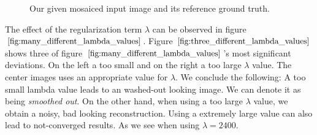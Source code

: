 \documentclass{paper}
\begin{document}
\begin{figure}[H]
\begin{center}

\end{center}
\caption{Our given mosaiced input image and its reference ground truth.}
\label{fig:input_and_ground_truth}
\end{figure}

The effect of the regularization term $\lambda$ can be observed in figure $\ref{fig:many_different_lambda_values}$. Figure $\ref{fig:three_different_lambda_values}$ shows three of figure $\ref{fig:many_different_lambda_values}$'s most significant deviations. On the left a too small and on the right a too large $\lambda$ value. The center images uses an appropriate value for $\lambda$. We conclude the following: A too small lambda value leads to an washed-out looking image. We can denote it as being \emph{smoothed out}. On the other hand, when using a too large $\lambda$ value, we obtain a noisy, bad looking reconstruction. Using a extremely large value can also lead to not-converged results. As we see when using $\lambda=2400$.
\end{document}
